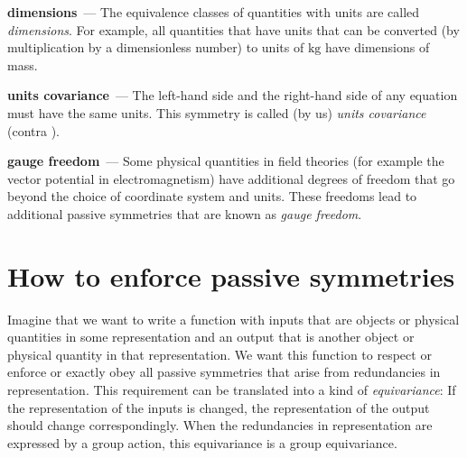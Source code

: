 \documentclass[11pt]{article}
\newcommand{\unit}[1]{\mathrm{#1}}
\newcommand{\kg}{\unit{kg}}
\renewcommand{\paragraph}[1]{\medskip\par\noindent\textbf{#1}~---}
\begin{document}
\paragraph{dimensions}
The equivalence classes of quantities with units are called \emph{dimensions}.
For example, all quantities that have units that can be converted (by multiplication by a dimensionless number) to units of $\kg$ have dimensions of mass.

\paragraph{units covariance}
The left-hand side and the right-hand side of any equation must have the same units.
This symmetry is called (by us) \emph{units covariance} (contra \cite{villar2022dimensionless}).

\paragraph{gauge freedom}
Some physical quantities in field theories (for example the vector potential in electromagnetism) have additional degrees of freedom that go beyond the choice of coordinate system and units.
These freedoms lead to additional passive symmetries that are known as \emph{gauge freedom}.

\section{How to enforce passive symmetries}

Imagine that we want to write a function with inputs that are objects or physical quantities in some representation and an output that is another object or physical quantity in that representation.
We want this function to respect or enforce or exactly obey all passive symmetries that arise from redundancies in representation.
This requirement can be translated into a kind of \emph{equivariance}:
If the representation of the inputs is changed, the representation of the output should change correspondingly.
When the redundancies in representation are expressed by a group action, this equivariance is a group equivariance.
\end{document}
